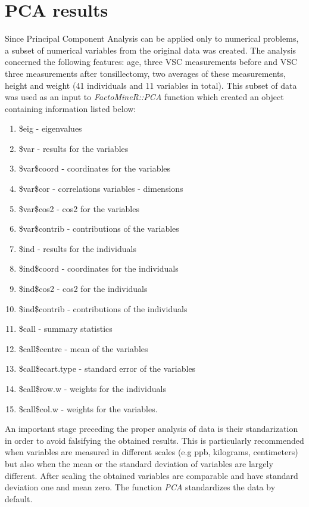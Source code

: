 \documentclass[12pt,a4paper,notitlepage]{report}
\begin{document}
\newpage
\section{PCA results}

Since Principal Component Analysis can be applied only to numerical problems, a subset of numerical variables from the original data was created. The analysis concerned the following features: age, three VSC measurements before and VSC three measurements after tonsillectomy, two averages of these measurements, height and weight (41 individuals and 11 variables in total). This subset of data was used as an input to \textit{FactoMineR::PCA} function which created an object containing information listed below: 

\begin{enumerate}
\item \$eig - eigenvalues
\item \$var - results for the variables
\item \$var\$coord - coordinates for the variables
\item \$var\$cor - correlations variables - dimensions
\item \$var\$cos2 - cos2 for the variables
\item \$var\$contrib - contributions of the variables
\item \$ind - results for the individuals
\item \$ind\$coord - coordinates for the individuals
\item \$ind\$cos2 - cos2 for the individuals
\item \$ind\$contrib - contributions of the individuals
\item \$call - summary statistics
\item \$call\$centre - mean of the variables
\item \$call\$ecart.type - standard error of the variables
\item \$call\$row.w - weights for the individuals
\item \$call\$col.w - weights for the variables.
\end{enumerate}

An important stage preceding the proper analysis of data is their standarization in order to avoid falsifying the obtained results. This is particularly recommended when variables are measured in different scales (e.g ppb, kilograms, centimeters) but also when the mean or the standard deviation of variables are largely different. After scaling the obtained variables are comparable and have standard deviation one and mean zero. The function \textit{PCA} standardizes the data by default.
\end{document}
